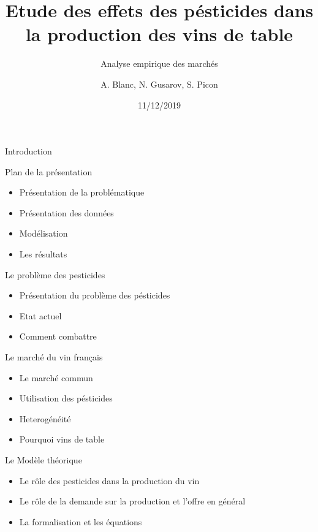 \documentclass[11pt,ignorenonframetext,]{beamer}
\title{Etude des effets des pésticides dans la production des vins de table}
\subtitle{Analyse empirique des marchés}
\author{A. Blanc, N. Gusarov, S. Picon}
\institute{Université Grenoble Alpes}
\date{11/12/2019}
\providecommand{\tightlist}{%
  \setlength{\itemsep}{0pt}\setlength{\parskip}{0pt}}
\begin{document}
\frame{\titlepage}

\begin{frame}
\tableofcontents[hideallsubsections]
\end{frame}
\begin{frame}{Introduction}
\protect\hypertarget{introduction}{}

\end{frame}

\begin{frame}{Plan de la présentation}
\protect\hypertarget{plan-de-la-presentation}{}

\begin{itemize}
\tightlist
\item
  Présentation de la problématique
\item
  Présentation des données
\item
  Modélisation
\item
  Les résultats
\end{itemize}

\end{frame}

\begin{frame}{Le problème des pesticides}
\protect\hypertarget{le-probleme-des-pesticides}{}

\begin{itemize}
\tightlist
\item
  Présentation du problème des pésticides
\item
  Etat actuel
\item
  Comment combattre
\end{itemize}

\end{frame}

\begin{frame}{Le marché du vin français}
\protect\hypertarget{le-marche-du-vin-francais}{}

\begin{itemize}
\tightlist
\item
  Le marché commun
\item
  Utilisation des pésticides
\item
  Heterogénéité
\item
  Pourquoi vins de table
\end{itemize}

\end{frame}

\begin{frame}{Le Modèle théorique}
\protect\hypertarget{le-modele-theorique}{}

\begin{itemize}
\tightlist
\item
  Le rôle des pesticides dans la production du vin
\item
  Le rôle de la demande sur la production et l'offre en général
\item
  La formalisation et les équations
\end{itemize}

\end{frame}
\end{document}
